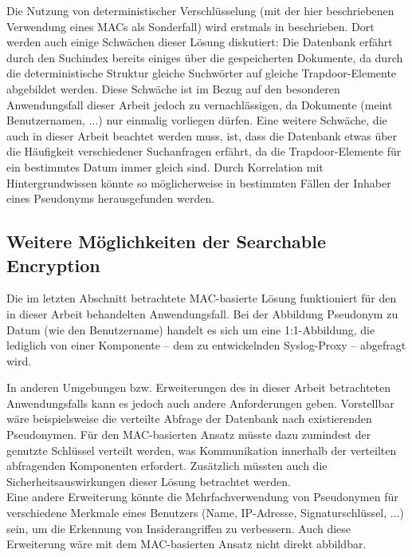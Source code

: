 Die Nutzung von deterministischer Verschlüsselung (mit der hier beschriebenen Verwendung eines MACs als Sonderfall) wird erstmals in \cite{bellare2007deterministic} beschrieben. Dort werden auch einige Schwächen dieser Lösung diskutiert: Die Datenbank erfährt durch den Suchindex bereits einiges über die gespeicherten Dokumente, da durch die deterministische Struktur gleiche Suchwörter auf gleiche Trapdoor-Elemente abgebildet werden. Diese Schwäche ist im Bezug auf den besonderen Anwendungsfall dieser Arbeit jedoch zu vernachlässigen, da Dokumente (meint Benutzernamen, ...) nur einmalig vorliegen dürfen. Eine weitere Schwäche, die auch in dieser Arbeit beachtet werden muss, ist, dass die Datenbank etwas über die Häufigkeit verschiedener Suchanfragen erfährt, da die Trapdoor-Elemente für ein bestimmtes Datum immer gleich sind. Durch Korrelation mit Hintergrundwissen könnte so möglicherweise in bestimmten Fällen der Inhaber eines Pseudonyms herausgefunden werden. 

\subsection{Weitere Möglichkeiten der Searchable Encryption}


Die im letzten Abschnitt betrachtete MAC-basierte Lösung funktioniert für den in dieser Arbeit behandelten Anwendungsfall. Bei der Abbildung Pseudonym zu Datum (wie den Benutzername) handelt es sich um eine 1:1-Abbildung, die lediglich von einer Komponente -- dem zu entwickelnden Syslog-Proxy  -- abgefragt wird. 

In anderen Umgebungen bzw. Erweiterungen des in dieser Arbeit betrachteten Anwendungsfalls kann es jedoch auch andere Anforderungen geben. Vorstellbar wäre beispielsweise die verteilte Abfrage der Datenbank nach existierenden Pseudonymen. Für den MAC-basierten Ansatz müsste dazu zumindest der genutzte Schlüssel verteilt werden, was Kommunikation innerhalb der verteilten abfragenden Komponenten erfordert. Zusätzlich müssten auch die Sicherheitsauswirkungen dieser Lösung betrachtet werden.\\
Eine andere Erweiterung könnte die Mehrfachverwendung von Pseudonymen für verschiedene Merkmale eines Benutzers (Name, IP-Adresse, Signaturschlüssel, ...) sein, um die Erkennung von Insiderangriffen zu verbessern. Auch diese Erweiterung wäre mit dem MAC-basierten Ansatz nicht direkt abbildbar.

